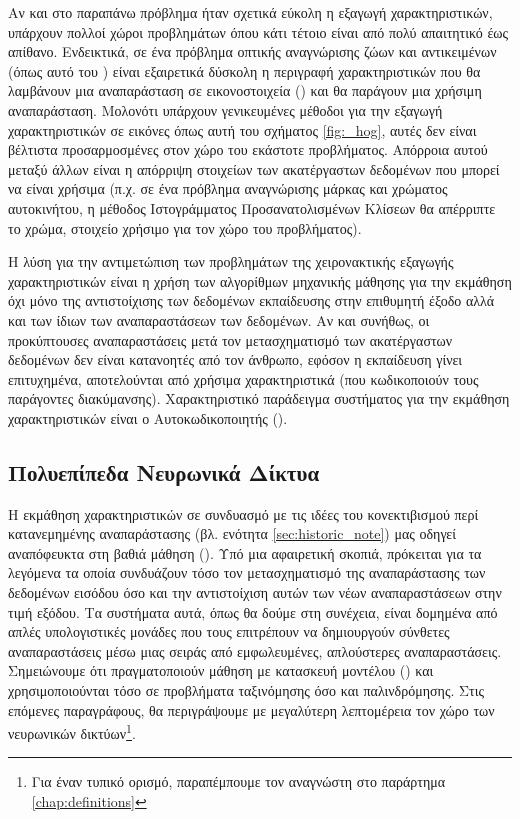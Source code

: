 Αν και στο παραπάνω πρόβλημα ήταν σχετικά εύκολη η  εξαγωγή χαρακτηριστικών, υπάρχουν πολλοί χώροι προβλημάτων όπου κάτι τέτοιο είναι από πολύ απαιτητικό έως απίθανο. Ενδεικτικά, σε ένα πρόβλημα οπτικής αναγνώρισης ζώων και αντικειμένων (όπως αυτό του \cite{krizhevsky2009learning}) είναι εξαιρετικά δύσκολη η περιγραφή χαρακτηριστικών που θα λαμβάνουν μια αναπαράσταση σε εικονοστοιχεία () και θα παράγουν μια χρήσιμη αναπαράσταση. Μολονότι υπάρχουν γενικευμένες μέθοδοι για την εξαγωγή χαρακτηριστικών σε εικόνες όπως αυτή του σχήματος \ref{fig:_hog}, αυτές δεν είναι βέλτιστα προσαρμοσμένες στον χώρο του εκάστοτε προβλήματος. Απόρροια αυτού μεταξύ άλλων είναι η απόρριψη στοιχείων των ακατέργαστων δεδομένων που μπορεί να είναι χρήσιμα (π.χ. σε ένα πρόβλημα αναγνώρισης μάρκας και χρώματος αυτοκινήτου, η μέθοδος Ιστογράμματος Προσανατολισμένων Κλίσεων θα απέρριπτε το χρώμα, στοιχείο χρήσιμο για τον χώρο του προβλήματος). \par

Η λύση για την αντιμετώπιση των προβλημάτων της χειρονακτικής εξαγωγής χαρακτηριστικών είναι η χρήση των αλγορίθμων μηχανικής μάθησης για την εκμάθηση όχι μόνο της αντιστοίχισης των δεδομένων εκπαίδευσης στην επιθυμητή έξοδο αλλά και των ίδιων των αναπαραστάσεων των δεδομένων. Αν και συνήθως, οι προκύπτουσες αναπαραστάσεις μετά τον μετασχηματισμό των ακατέργαστων δεδομένων δεν είναι κατανοητές από τον άνθρωπο, εφόσον η εκπαίδευση γίνει επιτυχημένα, αποτελούνται από χρήσιμα χαρακτηριστικά (που κωδικοποιούν τους παράγοντες διακύμανσης).
Χαρακτηριστικό παράδειγμα συστήματος για την εκμάθηση χαρακτηριστικών είναι ο Αυτοκωδικοποιητής ().

\subsection{Πολυεπίπεδα Νευρωνικά Δίκτυα}

Η εκμάθηση χαρακτηριστικών σε συνδυασμό με τις ιδέες του κονεκτιβισμού περί κατανεμημένης αναπαράστασης (βλ. ενότητα \ref{sec:historic_note}) μας οδηγεί αναπόφευκτα στη βαθιά μάθηση (). Υπό μια αφαιρετική σκοπιά, πρόκειται για τα λεγόμενα  τα οποία συνδυάζουν τόσο τον μετασχηματισμό της αναπαράστασης των δεδομένων εισόδου όσο και την αντιστοίχιση αυτών των νέων αναπαραστάσεων στην τιμή εξόδου. Τα συστήματα αυτά, όπως θα δούμε στη συνέχεια, είναι δομημένα από απλές υπολογιστικές μονάδες που τους επιτρέπουν να δημιουργούν σύνθετες αναπαραστάσεις μέσω μιας σειράς από εμφωλευμένες, απλούστερες αναπαραστάσεις. Σημειώνουμε ότι πραγματοποιούν μάθηση με κατασκευή μοντέλου () και χρησιμοποιούνται τόσο σε προβλήματα ταξινόμησης όσο και παλινδρόμησης. Στις επόμενες παραγράφους, θα περιγράψουμε με μεγαλύτερη λεπτομέρεια τον χώρο των νευρωνικών δικτύων\footnote{Για έναν τυπικό ορισμό, παραπέμπουμε τον αναγνώστη στο παράρτημα \ref{chap:definitions}}.

